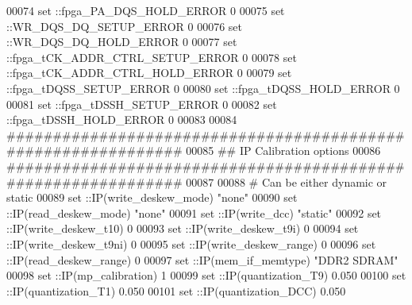 \begin{DoxyCode}
00074 \textcolor{comment}{}\textcolor{keyword}{set} ::fpga\_PA\_DQS\_HOLD\_ERROR 0\textcolor{comment}{}
00075 \textcolor{comment}{}\textcolor{keyword}{set} ::WR\_DQS\_DQ\_SETUP\_ERROR 0\textcolor{comment}{}
00076 \textcolor{comment}{}\textcolor{keyword}{set} ::WR\_DQS\_DQ\_HOLD\_ERROR 0\textcolor{comment}{}
00077 \textcolor{comment}{}\textcolor{keyword}{set} ::fpga\_tCK\_ADDR\_CTRL\_SETUP\_ERROR 0\textcolor{comment}{}
00078 \textcolor{comment}{}\textcolor{keyword}{set} ::fpga\_tCK\_ADDR\_CTRL\_HOLD\_ERROR 0\textcolor{comment}{}
00079 \textcolor{comment}{}\textcolor{keyword}{set} ::fpga\_tDQSS\_SETUP\_ERROR 0\textcolor{comment}{}
00080 \textcolor{comment}{}\textcolor{keyword}{set} ::fpga\_tDQSS\_HOLD\_ERROR 0\textcolor{comment}{}
00081 \textcolor{comment}{}\textcolor{keyword}{set} ::fpga\_tDSSH\_SETUP\_ERROR 0\textcolor{comment}{}
00082 \textcolor{comment}{}\textcolor{keyword}{set} ::fpga\_tDSSH\_HOLD\_ERROR 0\textcolor{comment}{}
00083 \textcolor{comment}{}
00084 \textcolor{comment}{##############################################################}
00085 \textcolor{comment}{}\textcolor{comment}{## IP Calibration options}
00086 \textcolor{comment}{}\textcolor{comment}{##############################################################}
00087 \textcolor{comment}{}
00088 \textcolor{comment}{# Can be either dynamic or static}
00089 \textcolor{comment}{}\textcolor{keyword}{set} ::IP(write\_deskew\_mode) "none"\textcolor{comment}{}
00090 \textcolor{comment}{}\textcolor{keyword}{set} ::IP(read\_deskew\_mode) "none"\textcolor{comment}{}
00091 \textcolor{comment}{}\textcolor{keyword}{set} ::IP(write\_dcc) "static"\textcolor{comment}{}
00092 \textcolor{comment}{}\textcolor{keyword}{set} ::IP(write\_deskew\_t10) 0\textcolor{comment}{}
00093 \textcolor{comment}{}\textcolor{keyword}{set} ::IP(write\_deskew\_t9i) 0\textcolor{comment}{}
00094 \textcolor{comment}{}\textcolor{keyword}{set} ::IP(write\_deskew\_t9ni) 0\textcolor{comment}{}
00095 \textcolor{comment}{}\textcolor{keyword}{set} ::IP(write\_deskew\_range) 0\textcolor{comment}{}
00096 \textcolor{comment}{}\textcolor{keyword}{set} ::IP(read\_deskew\_range) 0\textcolor{comment}{}
00097 \textcolor{comment}{}\textcolor{keyword}{set} ::IP(mem\_if\_memtype) "DDR2 SDRAM"\textcolor{comment}{}
00098 \textcolor{comment}{}\textcolor{keyword}{set} ::IP(mp\_calibration) 1\textcolor{comment}{}
00099 \textcolor{comment}{}\textcolor{keyword}{set} ::IP(quantization\_T9) 0.050\textcolor{comment}{}
00100 \textcolor{comment}{}\textcolor{keyword}{set} ::IP(quantization\_T1) 0.050\textcolor{comment}{}
00101 \textcolor{comment}{}\textcolor{keyword}{set} ::IP(quantization\_DCC) 0.050\textcolor{comment}{}

\end{DoxyCode}

